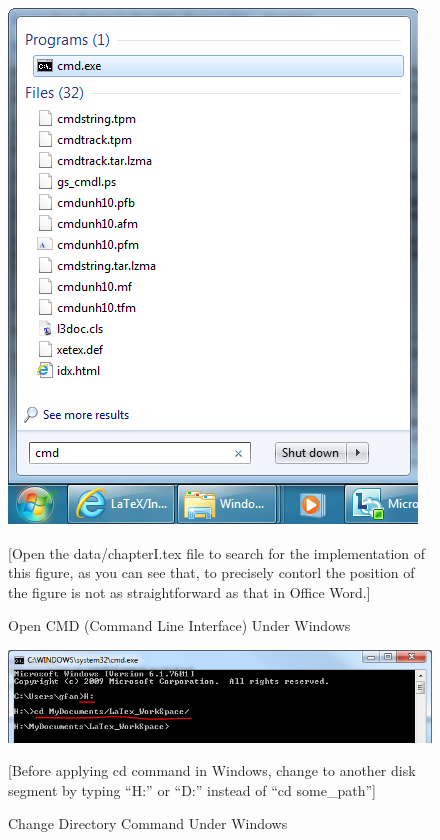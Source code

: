 \begin{figure}[!htbp]
\begin{center}
\includegraphics[width=\textwidth, height=0.4\textheight,keepaspectratio]{graphic/TAMUthesis_CMD_windows.png}
\caption{Open CMD (Command Line Interface) Under Windows}
[Open the data/chapterI.tex file to search for the implementation of this figure, as you can see that, to precisely contorl the position of the figure is not as straightforward as that in Office Word.]
\label{fig:CmdOpen}
\end{center}
\end{figure}

  
\begin{figure}[!htbp]
\begin{center}
\includegraphics[width=\textwidth, height=0.4\textheight,keepaspectratio]{graphic/TAMUthesis_CMD_windows_cd.png}
\caption{Change Directory Command Under Windows}
[Before applying cd command in Windows, change to another disk segment by typing ``H:'' or ``D:'' instead of ``cd some\_path'']
\label{fig:CmdCd}
\end{center}
\end{figure}
  

